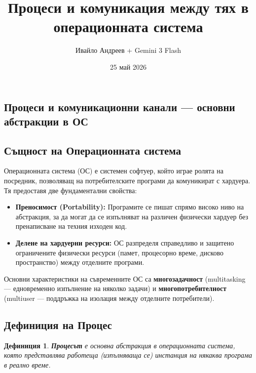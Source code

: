 \documentclass{scrartcl}
\title{Процеси и комуникация между тях в операционната система}
\author{Ивайло Андреев + Gemini 3 Flash}
\date{25 май 2026}
\newtheorem{definition}{Дефиниция}
\begin{document}
\maketitle

\tableofcontents

\newpage

\begin{FlushLeft}

\section{Процеси и комуникационни канали --- основни абстракции в ОС}

\subsection{Същност на Операционната система}
Операционната система (ОС) е системен софтуер, който играе ролята на посредник, позволяващ на потребителските програми да комуникират с хардуера. Тя предоставя две фундаментални свойства:
\begin{itemize}
    \item \textbf{Преносимост (Portability):} Програмите се пишат спрямо високо ниво на абстракция, за да могат да се изпълняват на различен физически хардуер без пренаписване на техния изходен код.
    \item \textbf{Делене на хардуерни ресурси:} ОС разпределя справедливо и защитено ограничените физически ресурси (памет, процесорно време, дисково пространство) между отделните програми.
\end{itemize}

Основни характеристики на съвременните ОС са \textbf{многозадачност} (multitasking --- едновременно изпълнение на няколко задачи) и \textbf{многопотребителност} (multiuser --- поддръжка на изолация между отделните потребители).

\subsection{Дефиниция на Процес}
\begin{definition}
\textbf{Процесът} е основна абстракция в операционната система, която представлява работеща (изпълняваща се) инстанция на някаква програма в реално време.
\end{definition}


\end{FlushLeft}
\end{document}
